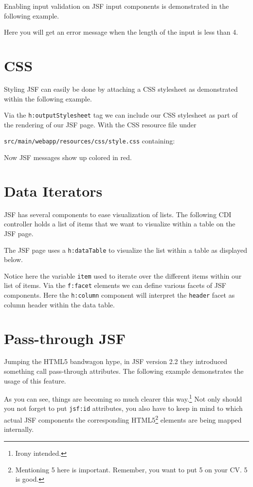 Enabling input validation on JSF input components is demonstrated in the following example.

Here you will get an error message when the length of the input is less than 4.

\section{CSS}

Styling JSF can easily be done by attaching a CSS stylesheet as demonstrated within the following example.

Via the \texttt{h:outputStylesheet} tag we can include our CSS stylesheet as part of the rendering of our JSF page.
With the CSS resource file under

\texttt{src/main/webapp/resources/css/style.css} containing:

Now JSF messages show up colored in red.

\section{Data Iterators}

JSF has several components to ease visualization of lists.
The following CDI controller holds a list of items that we want to visualize within a table on the JSF page.


The JSF page uses a \texttt{h:dataTable} to visualize the list within a table as displayed below.

Notice here the variable \texttt{item} used to iterate over the different items within our list of items.
Via the \texttt{f:facet} elements we can define various facets of JSF components.
Here the \texttt{h:column} component will interpret the \texttt{header} facet as column header within the data table.

\section{Pass-through JSF}
Jumping the HTML5 bandwagon hype, in JSF version 2.2 they introduced something call pass-through attributes.
The following example demonstrates the usage of this feature.

As you can see, things are becoming so much clearer this way.\footnote{Irony intended.}
Not only should you not forget to put \texttt{jsf:id} attributes,
you also have to keep in mind to which actual JSF components the corresponding HTML5\footnote{Mentioning 5 here is important. Remember, you want to put 5 on your CV. 5 is good.} elements are being mapped internally.

